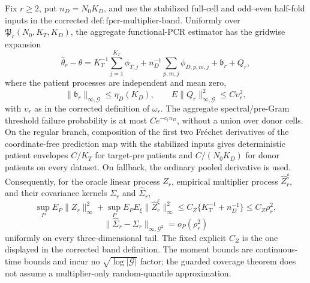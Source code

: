 Fix \(r\ge2\), put \(n_D=N_0K_D\), and use the stabilized full-cell and odd--even half-fold inputs in the corrected \(\mathrm{def:fpcr\mbox{-}multiplier\mbox{-}band}\). Uniformly over \(\mathfrak P_r(N_0,K_T,K_D)\), the aggregate functional-PCR estimator has the gridwise expansion
\[
 \widehat\theta_r-\theta
 =K_T^{-1}\sum_{j=1}^{K_T}\phi_{T,j}
 +n_D^{-1}\sum_{p,m,j}\phi_{D,p,m,j}
 +\mathfrak b_r+Q_r,
\]
where the patient processes are independent and mean zero,
\[
 \|\mathfrak b_r\|_{\infty,\mathcal G}\le\eta_D(K_D),
 \qquad E\|Q_r\|_{\infty,\mathcal G}^2\le C\upsilon_r^2,
\]
with \(\upsilon_r\) as in the corrected definition of \(\omega_r\). The aggregate spectral/pre-Gram threshold failure probability is at most \(Ce^{-c_\dagger n_D}\), without a union over donor cells. On the regular branch, composition of the first two Fr\'echet derivatives of the coordinate-free prediction map with the stabilized inputs gives deterministic patient envelopes \(C/K_T\) for target-pre patients and \(C/(N_0K_D)\) for donor patients on every dataset. On fallback, the ordinary pooled derivative is used. Consequently, for the oracle linear process \(Z_r\), empirical multiplier process \(\widehat Z_r^\xi\), and their covariance kernels \(\Sigma_r\) and \(\widehat\Sigma_r\),
\[
 \sup_PE_P\|Z_r\|_\infty^2
 +\sup_PE_PE_\xi\|\widehat Z_r^\xi\|_\infty^2
 \le C_Z\{K_T^{-1}+n_D^{-1}\}\le C_Z\rho_r^2,
\]
\[
 \|\widehat\Sigma_r-\Sigma_r\|_{\infty,\mathcal G^2}
 =o_P(\rho_r^2)
\]
uniformly on every three-dimensional tail. The fixed explicit \(C_Z\) is the one displayed in the corrected band definition. The moment bounds are continuous-time bounds and incur no \(\sqrt{\log|\mathcal G|}\) factor; the guarded coverage theorem does not assume a multiplier-only random-quantile approximation.
